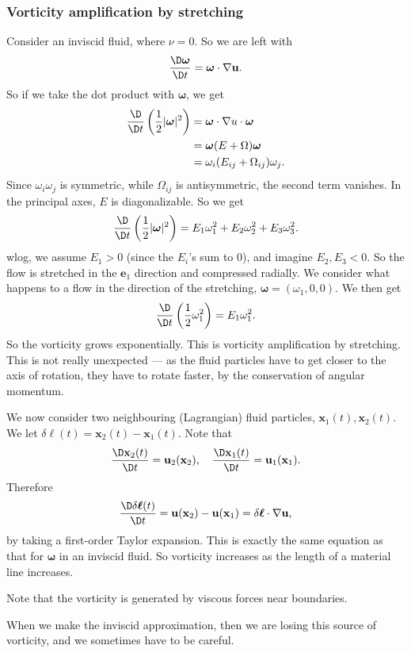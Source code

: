 \documentclass[a4paper]{article}
\begin{document}
\subsubsection{Vorticity amplification by stretching}
Consider an inviscid fluid, where $\nu = 0$. So we are left with
\[
  \frac{\D \boldsymbol\omega}{\D t} = \boldsymbol\omega \cdot \nabla \mathbf{u}.
\]
So if we take the dot product with $\boldsymbol\omega$, we get
\begin{align*}
  \frac{\D}{\D t}\left(\frac{1}{2} |\boldsymbol\omega|^2\right) &= \boldsymbol\omega \cdot \nabla u \cdot \boldsymbol\omega\\
  &= \boldsymbol\omega (E + \Omega) \boldsymbol\omega\\
  &= \omega_i (E_{ij} + \Omega_{ij}) \omega_j.
\end{align*}
Since $\omega_i \omega_j$ is symmetric, while $\Omega_{ij}$ is antisymmetric, the second term vanishes. In the principal axes, $E$ is diagonalizable. So we get
\[
  \frac{\D}{\D t} \left(\frac{1}{2} |\boldsymbol\omega|^2\right) = E_1 \omega_1^2 + E_2 \omega_2^2 + E_3 \omega_3^2.
\]
wlog, we assume $E_1 > 0$ (since the $E_i$'s sum to $0$), and imagine $E_2, E_3 < 0$. So the flow is stretched in the $\mathbf{e}_1$ direction and compressed radially. We consider what happens to a flow in the direction of the stretching, $\boldsymbol\omega = (\omega_1, 0, 0)$. We then get
\[
  \frac{\D}{\D t}\left(\frac{1}{2}\omega_1^2\right) = E_1 \omega_1^2.
\]
So the vorticity grows exponentially. This is vorticity amplification by stretching. This is not really unexpected --- as the fluid particles have to get closer to the axis of rotation, they have to rotate faster, by the conservation of angular momentum.

We now consider two neighbouring (Lagrangian) fluid particles, $\mathbf{x}_1(t), \mathbf{x}_2(t)$. We let $\delta\boldsymbol\ell(t) = \mathbf{x}_2(t) - \mathbf{x}_1(t)$. Note that
\[
  \frac{\D \mathbf{x}_2(t)}{\D t} = \mathbf{u}_2(\mathbf{x}_2),\quad \frac{\D \mathbf{x}_1(t)}{\D t} = \mathbf{u}_1(\mathbf{x}_1).
\]
Therefore
\[
  \frac{\D \delta \boldsymbol\ell(t)}{\D t} = \mathbf{u}(\mathbf{x}_2) - \mathbf{u}(\mathbf{x}_1) = \delta \boldsymbol\ell \cdot \nabla \mathbf{u},
\]
by taking a first-order Taylor expansion. This is exactly the same equation as that for $\boldsymbol\omega$ in an inviscid fluid. So vorticity increases as the length of a material line increases.

Note that the vorticity is generated by viscous forces near boundaries.
\begin{center}
\end{center}
When we make the inviscid approximation, then we are losing this source of vorticity, and we sometimes have to be careful.
\end{document}
